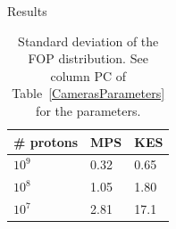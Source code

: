 \documentclass[final]{beamer} %
\newcommand{\mc}[3]{\multicolumn{#1}{#2}{#3}}
\newcommand{\tcr}[1]{\textcolor{red}{#1}}
\begin{document}
\begin{frame}{}
\begin{columns}[t]
\begin{column}{0.49\textwidth}
\begin{block}{Results}
				
			{}
			\begin{table}[h]
			\centering
			\begin{tabular}{lll}
				\midrule
				\# protons 						& MPS & KES  \\
				\midrule
				$10^9$ & 0.32 & 0.65 \\
				$10^8$    				& 1.05 & 1.80 \\
				$10^7$    				& 2.81 & 17.1 \\
				\midrule
			\end{tabular}
			\caption{Standard deviation of the FOP distribution. See column PC of Table~\ref{CamerasParameters} for the parameters.}
			\label{FRPCOMP}
			\end{table}					
		\end{block}


\end{column}
\end{columns}
\end{frame}
\end{document}
